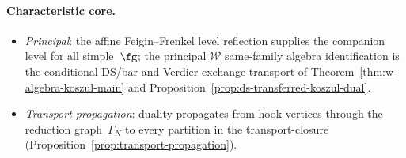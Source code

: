 \paragraph{Characteristic core.}
\begin{itemize}
\item \emph{Principal}: the affine Feigin--Frenkel level reflection
 supplies the companion level for all simple~$\fg$; the principal
 $\mathcal W$ same-family algebra identification is the conditional
 DS/bar and Verdier-exchange transport of
 Theorem~\ref{thm:w-algebra-koszul-main} and
 Proposition~\ref{prop:ds-transferred-koszul-dual}.
\item \emph{Transport propagation}: duality propagates from hook
 vertices through the reduction graph~$\Gamma_N$ to every
 partition in the transport-closure
 (Proposition~\ref{prop:transport-propagation}).
\end{itemize}

